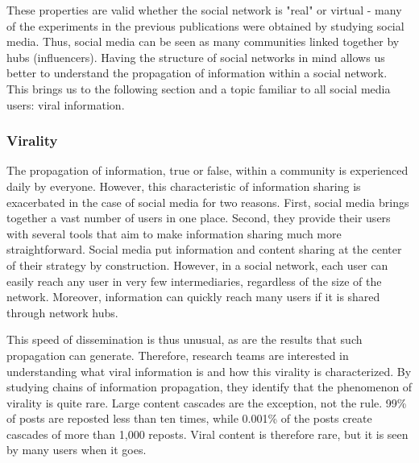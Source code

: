 These properties are valid whether the social network is "real" or virtual - many of the experiments in the previous publications were obtained by studying social media.
Thus, social media can be seen as many communities linked together by hubs (influencers).
Having the structure of social networks in mind allows us better to understand the propagation of information within a social network.
This brings us to the following section and a topic familiar to all social media users: viral information.

\subsubsection{Virality}
The propagation of information, true or false, within a community is experienced daily by everyone.
However, this characteristic of information sharing is exacerbated in the case of social media for two reasons.
First, social media brings together a vast number of users in one place.
Second, they provide their users with several tools that aim to make information sharing much more straightforward.
Social media put information and content sharing at the center of their strategy by construction.
However, in a social network, each user can easily reach any user in very few intermediaries, regardless of the size of the network.
Moreover, information can quickly reach many users if it is shared through network hubs.

This speed of dissemination is thus unusual, as are the results that such propagation can generate.
Therefore, research teams are interested in understanding what viral information is and how this virality is characterized.
By studying chains of information propagation, they identify that the phenomenon of virality is quite rare.
Large content cascades are the exception, not the rule.
99\% of posts are reposted less than ten times, while 0.001\% of the posts create cascades of more than 1,000 reposts.
Viral content is therefore rare, but it is seen by many users when it goes.

